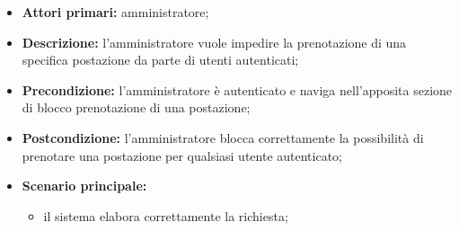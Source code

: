 \begin{itemize}
\item \textbf{Attori primari:} amministratore;
\item \textbf{Descrizione:} l’amministratore vuole impedire la prenotazione di una specifica postazione da parte di utenti autenticati;
\item \textbf{Precondizione:} l’amministratore è autenticato e naviga nell’apposita sezione di blocco prenotazione di una postazione;
\item \textbf{Postcondizione:} l’amministratore blocca correttamente la possibilità di prenotare una postazione per qualsiasi utente autenticato;
\item \textbf{Scenario principale:} 
	\begin{itemize}
		\item il sistema elabora correttamente la richiesta;
		\end{itemize}
\end{itemize}
